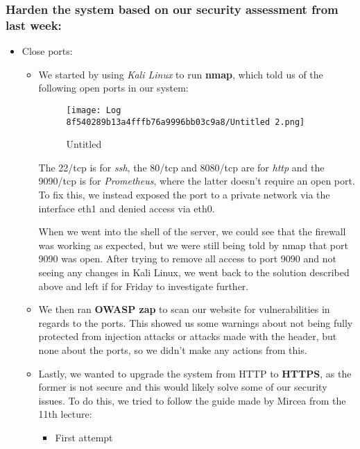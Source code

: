 \subsubsection{Harden the system based on our security assessment from last week:}
\label{log:harden-the-system-based-on-our-security-assessment-from-last-week}

\begin{itemize}
\item Close ports:

    \begin{itemize}
        \item We started by using \emph{Kali Linux} to run \textbf{nmap}, which told us of the following open ports in our system:
        \begin{figure}
        \centering
        \texttt{[image: Log 8f540289b13a4fffb76a9996bb03c9a8/Untitled 2.png]}
        \caption{Untitled}
        \end{figure}
        The 22/tcp is for \emph{ssh}, the 80/tcp and 8080/tcp are for \emph{http} and the 9090/tcp is for \emph{Prometheus}, where the latter doesn't require an open port. To fix this, we instead exposed the port to a private network via the interface eth1 and denied access via eth0.

        When we went into the shell of the server, we could see that the firewall was working as expected, but we were still being told by nmap that port 9090 was open. After trying to remove all access to port 9090 and not seeing any changes in Kali Linux, we went back to the solution described above and left if for Friday to investigate further.

        \item We then ran \textbf{OWASP zap} to scan our website for vulnerabilities in regards to the ports. This showed us some warnings about not being fully protected from injection attacks or attacks made with the header, but none about the ports, so we didn't make any actions from this.
        \item Lastly, we wanted to upgrade the system from HTTP to \textbf{HTTPS}, as the former is not secure and this would likely solve some of our security issues. To do this, we tried to follow the guide made by Mircea from the 11th lecture:

        \begin{itemize}
            \item First attempt


\end{itemize}
\end{itemize}
\end{itemize}
